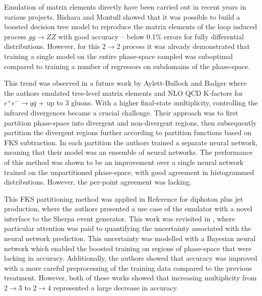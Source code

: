 \documentclass[main.tex]{subfiles}
\begin{document}
    Emulation of matrix elements directly have been
    carried out in recent years in various projects.
    Bishara and Montull showed \cite{Bishara:2019iwh} that it was possible to
    build a boosted decision tree model to reproduce
    the matrix elements of the loop induced process $gg \rightarrow ZZ$ with good accuracy --
    below 0.1\% errors for fully differential distributions.
    However, for this $2 \rightarrow 2$ process it was already demonstrated
    that training a single model on the entire phase-space sampled
    was suboptimal compared to training a number of regressors
    on subdomains of the phase-space.

    This trend was observed in a future work by Aylett-Bullock
    and Badger \cite{Badger:2020uow} where the authors emulated tree-level
    matrix elements and NLO QCD K-factors for $e^{+}e^{-} \rightarrow q \bar{q}$ +
    up to 3 gluons. With a higher final-state multiplicity, controlling
    the infrared divergences became a crucial challenge.
    Their approach was to first partition phase-space
    into divergent and non-divergent regions, then subsequently
    partition the divergent regions further according to partition functions
    based on FKS subtraction.
    In each partition the authors trained a separate neural network,
    meaning that their model was an ensemble of neural networks.
    The performance of this method was shown to be an improvement
    over a single neural network trained on the unpartitioned phase-space,
    with good agreement in histogrammed distributions. However,
    the per-point agreement was lacking.

    This FKS partitioning method was applied in Reference \cite{Aylett-Bullock:2021hmo}
    for diphoton plus jet production, where the authors presented a
    use case of the emulator with a novel interface to the Sherpa event generator.
    This work was revisited in \cite{Badger:2022hwf},
    where particular attention was paid to quantifying the uncertainty associated
    with the neural network prediction. This uncertainty was
    modelled with a Bayesian neural network which enabled
    the boosted training on regions of phase-space that were
    lacking in accuracy. Additionally, the authors showed
    that accuracy was improved with a more careful
    preprocessing of the training data compared to
    the previous treatment.
    However, both of these works showed that increasing
    multiplicity from $2 \rightarrow 3$ to $2 \rightarrow 4$
    represented a large decrease in accuracy.
\end{document}
